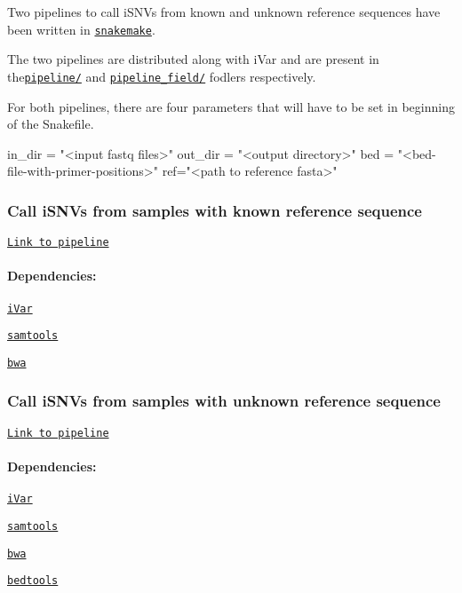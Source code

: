 Two pipelines to call i\+S\+N\+Vs from known and unknown reference sequences have been written in \href{https://snakemake.readthedocs.io/en/stable/}{\tt snakemake}.

The two pipelines are distributed along with i\+Var and are present in the\href{https://github.com/andersen-lab/ivar/tree/master/pipeline}{\tt pipeline/} and \href{https://github.com/andersen-lab/ivar/tree/master/pipeline_field}{\tt pipeline\+\_\+field/} fodlers respectively.

For both pipelines, there are four parameters that will have to be set in beginning of the Snakefile.


\begin{DoxyCode}
in\_dir = "<input fastq files>"
out\_dir = "<output directory>"
bed = "<bed-file-with-primer-positions>"
ref="<path to reference fasta>"
\end{DoxyCode}


\subsubsection*{Call i\+S\+N\+Vs from samples with known reference sequence}

\href{https://github.com/andersen-lab/ivar/tree/master/pipeline}{\tt Link to pipeline}

\paragraph*{Dependencies\+:}


\begin{DoxyItemize}
\item \href{https://github.com/andersen-lab/ivar}{\tt i\+Var}
\item \href{https://htslib.org/}{\tt samtools}
\item \href{https://github.com/lh3/bwa}{\tt bwa}
\end{DoxyItemize}



\subsubsection*{Call i\+S\+N\+Vs from samples with unknown reference sequence}

\href{https://github.com/andersen-lab/ivar/tree/master/pipeline_field/}{\tt Link to pipeline}

\paragraph*{Dependencies\+:}


\begin{DoxyItemize}
\item \href{https://github.com/andersen-lab/ivar}{\tt i\+Var}
\item \href{https://htslib.org/}{\tt samtools}
\item \href{https://github.com/lh3/bwa}{\tt bwa}
\item \href{https://bedtools.readthedocs.io/en/latest/}{\tt bedtools}
\end{DoxyItemize}

 